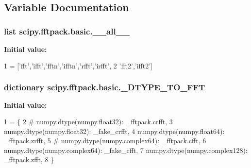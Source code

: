 \subsection{Variable Documentation}
\hypertarget{namespacescipy_1_1fftpack_1_1basic_ac5fa46b8b54ce6d6dcae3ec8f993ce80}{}
\subsubsection[{\+\_\+\+\_\+all\+\_\+\+\_\+}]{\setlength{\rightskip}{0pt plus 5cm}list scipy.\+fftpack.\+basic.\+\_\+\+\_\+all\+\_\+\+\_\+}\label{namespacescipy_1_1fftpack_1_1basic_ac5fa46b8b54ce6d6dcae3ec8f993ce80}
{\bfseries Initial value\+:}
\begin{DoxyCode}
1 = [\textcolor{stringliteral}{'fft'},\textcolor{stringliteral}{'ifft'},\textcolor{stringliteral}{'fftn'},\textcolor{stringliteral}{'ifftn'},\textcolor{stringliteral}{'rfft'},\textcolor{stringliteral}{'irfft'},
2            \textcolor{stringliteral}{'fft2'},\textcolor{stringliteral}{'ifft2'}]
\end{DoxyCode}
\hypertarget{namespacescipy_1_1fftpack_1_1basic_a5db7b7feacab3f4adef70fda5f2b329d}{}
\subsubsection[{\+\_\+\+D\+T\+Y\+P\+E\+\_\+\+T\+O\+\_\+\+F\+F\+T}]{\setlength{\rightskip}{0pt plus 5cm}dictionary scipy.\+fftpack.\+basic.\+\_\+\+D\+T\+Y\+P\+E\+\_\+\+T\+O\+\_\+\+F\+F\+T}\label{namespacescipy_1_1fftpack_1_1basic_a5db7b7feacab3f4adef70fda5f2b329d}
{\bfseries Initial value\+:}
\begin{DoxyCode}
1 = \{
2 \textcolor{comment}{#        numpy.dtype(numpy.float32): \_fftpack.crfft,}
3         numpy.dtype(numpy.float32): \_fake\_crfft,
4         numpy.dtype(numpy.float64): \_fftpack.zrfft,
5 \textcolor{comment}{#        numpy.dtype(numpy.complex64): \_fftpack.cfft,}
6         numpy.dtype(numpy.complex64): \_fake\_cfft,
7         numpy.dtype(numpy.complex128): \_fftpack.zfft,
8 \}
\end{DoxyCode}
\hypertarget{namespacescipy_1_1fftpack_1_1basic_a22c987ab3659bd6992f8c4211cd9a56d}{}
